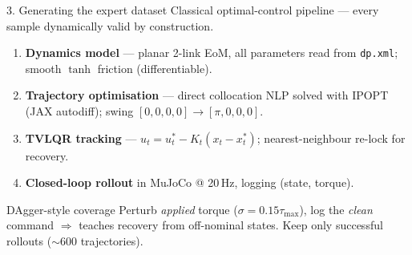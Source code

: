 \documentclass[aspectratio=169,11pt]{beamer}
\begin{document}
\begin{frame}{3. Generating the expert dataset}
  Classical optimal-control pipeline — every sample dynamically valid by construction.
  \begin{enumerate}
    \item \textbf{Dynamics model} — planar 2-link EoM, all parameters read from \texttt{dp.xml}; smooth $\tanh$ friction (differentiable).
    \item \textbf{Trajectory optimisation} — direct collocation NLP solved with IPOPT (JAX autodiff); swing $[0,0,0,0]\to[\pi,0,0,0]$.
    \item \textbf{TVLQR tracking} — $u_t = u^\ast_t - K_t(x_t-x^\ast_t)$; nearest-neighbour re-lock for recovery.
    \item \textbf{Closed-loop rollout} in MuJoCo @ 20\,Hz, logging (state, torque).
  \end{enumerate}
  \begin{alertblock}{DAgger-style coverage}
    Perturb \emph{applied} torque ($\sigma=0.15\tau_{\max}$), log the \emph{clean} command $\Rightarrow$ teaches recovery from off-nominal states. Keep only successful rollouts ($\sim$600 trajectories).
  \end{alertblock}
\end{frame}
\end{document}
